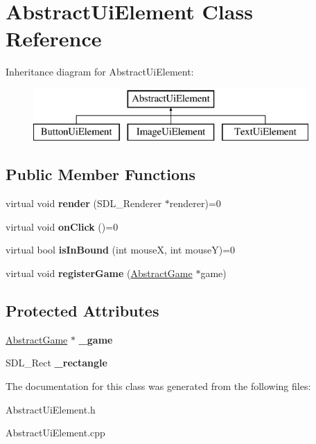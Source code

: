 \hypertarget{class_abstract_ui_element}{}\section{Abstract\+Ui\+Element Class Reference}
\label{class_abstract_ui_element}
Inheritance diagram for Abstract\+Ui\+Element\+:\begin{figure}[H]
\begin{center}
\leavevmode
\includegraphics[height=2.000000cm]{class_abstract_ui_element}
\end{center}
\end{figure}
\subsection*{Public Member Functions}
\begin{DoxyCompactItemize}
\item 
\mbox{\label{class_abstract_ui_element_afacedc89a5805d95d3bdcf20619b1c06}} 
virtual void {\bfseries render} (S\+D\+L\+\_\+\+Renderer $\ast$renderer)=0
\item 
\mbox{\label{class_abstract_ui_element_a42296c15c9e70b6ac7fda0b1862612af}} 
virtual void {\bfseries on\+Click} ()=0
\item 
\mbox{\label{class_abstract_ui_element_ad2c415461cd7e8c1ee50b1105eb84685}} 
virtual bool {\bfseries is\+In\+Bound} (int mouseX, int mouseY)=0
\item 
\mbox{\label{class_abstract_ui_element_aea8a32a77e77f601ca114b8738072079}} 
virtual void {\bfseries register\+Game} (\mbox{\hyperlink{class_abstract_game}{Abstract\+Game}} $\ast$game)
\end{DoxyCompactItemize}
\subsection*{Protected Attributes}
\begin{DoxyCompactItemize}
\item 
\mbox{\label{class_abstract_ui_element_ad80a25aa84eb844afd1c5e091063e8fb}} 
\mbox{\hyperlink{class_abstract_game}{Abstract\+Game}} $\ast$ {\bfseries \+\_\+game}
\item 
\mbox{\label{class_abstract_ui_element_a91aa849cd7db2aac4b7dd36d6094961d}} 
S\+D\+L\+\_\+\+Rect {\bfseries \+\_\+rectangle}
\end{DoxyCompactItemize}


The documentation for this class was generated from the following files\+:\begin{DoxyCompactItemize}
\item 
Abstract\+Ui\+Element.\+h\item 
Abstract\+Ui\+Element.\+cpp\end{DoxyCompactItemize}
